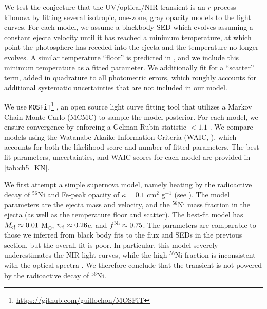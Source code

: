 We test the conjecture that the UV/optical/NIR transient is an $r$-process kilonova by fitting several isotropic, one-zone, gray opacity models to the light curves. For each model, we assume a blackbody SED which evolves assuming a constant ejecta velocity until it has reached a minimum temperature, at which point the photosphere has receded into the ejecta and the temperature no longer evolves. A similar temperature ``floor'' is predicted in \cite{BarnesKasen13}, and we include this minimum temperature as a fitted parameter.  We additionally fit for a ``scatter'' term, added in quadrature to all photometric errors, which roughly accounts for additional systematic uncertainties that are not included in our model.

We use {\tt MOSFiT}\footnote{\url{https://github.com/guillochon/MOSFiT}} \citep{mosfitpaper,Nicholl+17b}, an open source light curve fitting tool that utilizes a Markov Chain Monte Carlo (MCMC) to sample the model posterior. For each model, we ensure convergence by enforcing a Gelman-Rubin statistic $<1.1$ \citep{GelmanRubin92}.  We compare models using the Watanabe-Akaike Information Criteria (WAIC, \citealt{watanabe2010asymptotic,gelman2014understanding}), which accounts for both the likelihood score and number of fitted parameters. The best fit parameters, uncertainties, and WAIC scores for each model are provided in \cref{tab:ch5_KN}.

We first attempt a simple supernova model, namely heating by the radioactive decay of $^{56}$Ni and Fe-peak opacity of $\kappa = 0.1$ cm$^{2}$ g$^{-1}$ (see \citealt{Villar+17}).  The model parameters are the ejecta mass and velocity, and the $^{56}$Ni mass fraction in the ejecta (as well as the temperature floor and scatter).  The best-fit model has $M_{\rm ej}\approx 0.01$ M$_\odot$, $v_{\rm ej}\approx 0.26$c, and $f^{\rm Ni}\approx 0.75$.  The parameters are comparable to those we inferred from black body fits to the flux and SEDs in the previous section, but the overall fit is poor.  In particular, this model severely underestimates the NIR light curves, while the high $^{56}$Ni fraction is inconsistent with the optical spectra \citep{Nicholl+17a}.  We therefore conclude that the transient is not powered by the radioactive decay of $^{56}$Ni.

